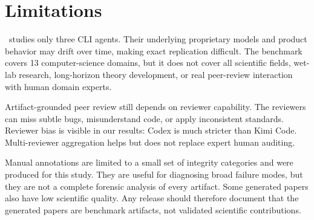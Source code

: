 \section{Limitations}

\ra\ studies only three CLI agents. Their underlying proprietary models and product behavior may drift over time, making exact replication difficult. The benchmark covers 13 computer-science domains, but it does not cover all scientific fields, wet-lab research, long-horizon theory development, or real peer-review interaction with human domain experts.

Artifact-grounded peer review still depends on reviewer capability. The reviewers can miss subtle bugs, misunderstand code, or apply inconsistent standards. Reviewer bias is visible in our results: Codex is much stricter than Kimi Code. Multi-reviewer aggregation helps but does not replace expert human auditing.

Manual annotations are limited to a small set of integrity categories and were produced for this study. They are useful for diagnosing broad failure modes, but they are not a complete forensic analysis of every artifact. Some generated papers also have low scientific quality. Any release should therefore document that the generated papers are benchmark artifacts, not validated scientific contributions.
